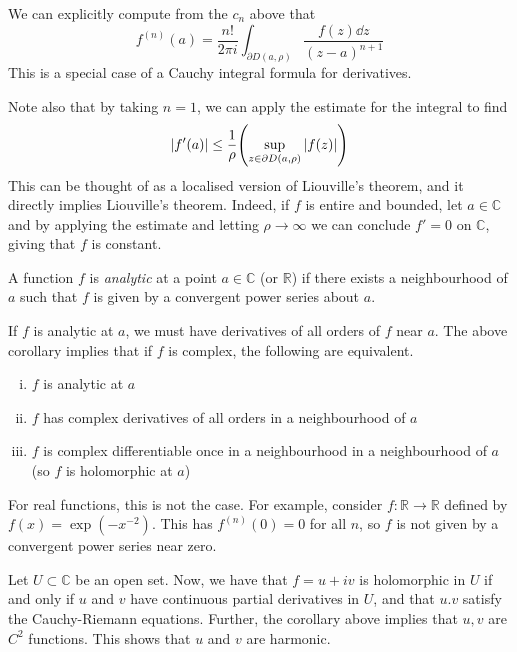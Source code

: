 \begin{remark}
	We can explicitly compute from the \( c_n \) above that
	\[ f^{(n)}(a) = \frac{n!}{2\pi i}\int_{\partial D(a,\rho)} \frac{f(z) \dd{z}}{(z-a)^{n+1}} \]
	This is a special case of a Cauchy integral formula for derivatives.

	Note also that by taking \( n = 1 \), we can apply the estimate for the integral to find
	\[ \abs{f'(a)} \leq \frac{1}{\rho}\qty(\sup_{z \in \partial D(a,\rho)} \abs{f(z)}) \]
	This can be thought of as a localised version of Liouville's theorem, and it directly implies Liouville's theorem.
	Indeed, if \( f \) is entire and bounded, let \( a \in \mathbb C \) and by applying the estimate and letting \( \rho \to \infty \) we can conclude \( f' = 0 \) on \( \mathbb C \), giving that \( f \) is constant.
\end{remark}
\begin{definition}
	A function \( f \) is \textit{analytic} at a point \( a \in \mathbb C \) (or \( \mathbb R \)) if there exists a neighbourhood of \( a \) such that \( f \) is given by a convergent power series about \( a \).
\end{definition}
\begin{remark}
	If \( f \) is analytic at \( a \), we must have derivatives of all orders of \( f \) near \( a \).
	The above corollary implies that if \( f \) is complex, the following are equivalent.
	\begin{enumerate}[(i)]
		\item \( f \) is analytic at \( a \)
		\item \( f \) has complex derivatives of all orders in a neighbourhood of \( a \)
		\item \( f \) is complex differentiable once in a neighbourhood in a neighbourhood of \( a \) (so \( f \) is holomorphic at \( a \))
	\end{enumerate}
	For real functions, this is not the case.
	For example, consider \( f \colon \mathbb R \to \mathbb R \) defined by \( f(x) = \exp(-x^{-2}) \).
	This has \( f^{(n)}(0) = 0 \) for all \( n \), so \( f \) is not given by a convergent power series near zero.

	Let \( U \subset \mathbb C \) be an open set.
	Now, we have that \( f = u+iv \) is holomorphic in \( U \) if and only if \( u \) and \( v \) have continuous partial derivatives in \( U \), and that \( u.v \) satisfy the Cauchy-Riemann equations.
	Further, the corollary above implies that \( u, v \) are \( C^2 \) functions.
	This shows that \( u \) and \( v \) are harmonic.
\end{remark}

